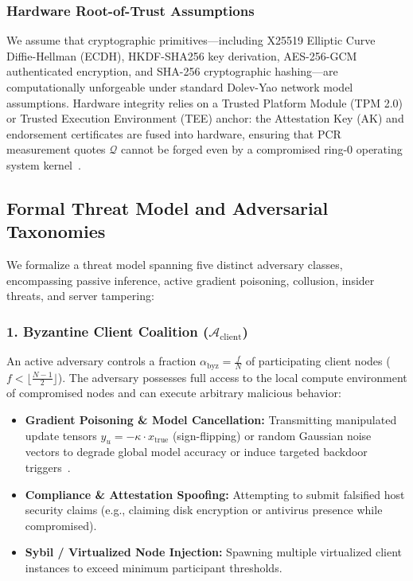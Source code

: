 \subsubsection{Hardware Root-of-Trust Assumptions}
We assume that cryptographic primitives—including X25519 Elliptic Curve Diffie-Hellman (ECDH), HKDF-SHA256 key derivation, AES-256-GCM authenticated encryption, and SHA-256 cryptographic hashing—are computationally unforgeable under standard Dolev-Yao network model assumptions. Hardware integrity relies on a Trusted Platform Module (TPM 2.0) or Trusted Execution Environment (TEE) anchor: the Attestation Key (AK) and endorsement certificates are fused into hardware, ensuring that PCR measurement quotes $\mathcal{Q}$ cannot be forged even by a compromised ring-0 operating system kernel~\cite{mo2021ppfl}.

\subsection{Formal Threat Model and Adversarial Taxonomies}

We formalize a threat model spanning five distinct adversary classes, encompassing passive inference, active gradient poisoning, collusion, insider threats, and server tampering:

\subsubsection{1. Byzantine Client Coalition ($\mathcal{A}_{\text{client}}$)}
An active adversary controls a fraction $\alpha_{\text{byz}} = \frac{f}{N}$ of participating client nodes ($f < \lfloor \frac{N-1}{2} \rfloor$). The adversary possesses full access to the local compute environment of compromised nodes and can execute arbitrary malicious behavior:
\begin{itemize}
    \item \textbf{Gradient Poisoning \& Model Cancellation:} Transmitting manipulated update tensors $y_u = -\kappa \cdot x_{\text{true}}$ (sign-flipping) or random Gaussian noise vectors to degrade global model accuracy or induce targeted backdoor triggers~\cite{fang2020local}.
    \item \textbf{Compliance \& Attestation Spoofing:} Attempting to submit falsified host security claims (e.g., claiming disk encryption or antivirus presence while compromised).
    \item \textbf{Sybil / Virtualized Node Injection:} Spawning multiple virtualized client instances to exceed minimum participant thresholds.
\end{itemize}


